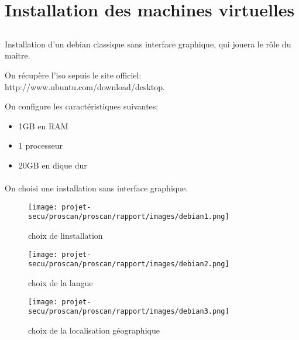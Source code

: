 \documentclass[11pt,a4paper,titlepage, oneside]{article}
\begin{document}
		
\newpage
\thispagestyle{empty}
\tableofcontents
\listoffigures  %

\newpage
{} \setcounter{page}{1}
\section{{\color{red}Installation des machines virtuelles}}
\subsection{{\color{blue}{Installation du serveur Debian}}}
	\paragraph{}
		Installation d'un debian classique sans interface graphique, qui jouera le rôle du maitre.
		
		On récupère l'iso sepuis le site officiel: http://www.ubuntu.com/download/desktop.

		On configure les caractéristiques suivantes:
		\begin{itemize}
                        \item{1GB en RAM}
                        \item{1 processeur}
                        \item{20GB en dique dur}
                \end{itemize}
 		\paragraph{}
		On choisi une installation sans interface graphique.
		 \begin{figure}[h]
                        \centering
                        \texttt{[image: projet-secu/proscan/proscan/rapport/images/debian1.png]}
                        \caption{choix de linstallation}
                \end{figure}
		

	\newpage		
		\begin{figure}[h]
                        \centering
                        \texttt{[image: projet-secu/proscan/proscan/rapport/images/debian2.png]}
                        \caption{choix de la langue}
                \end{figure}
	\newpage
		\begin{figure}[h]
                        \centering
                        \texttt{[image: projet-secu/proscan/proscan/rapport/images/debian3.png]}
                        \caption{choix de la localisation géographique}
                \end{figure}
\end{document}
